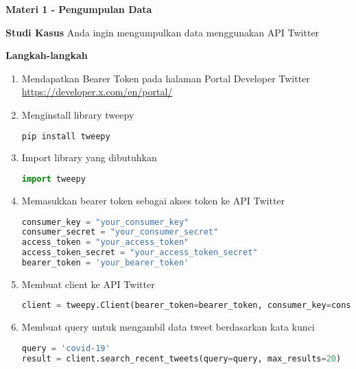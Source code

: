 \documentclass{article}
\begin{document}
    \begin{flushleft}
        \textbf{Materi 1 - Pengumpulan Data}
        \newline
        
        \textbf{Studi Kasus}
        \newline
        Anda ingin mengumpulkan data menggunakan API Twitter
        \newline

        \textbf{Langkah-langkah}

        \begin{enumerate}
            \item Mendapatkan Bearer Token pada halaman Portal Developer Twitter \href{https://developer.x.com/en/portal/}{https://developer.x.com/en/portal/}
            \item Menginstall library tweepy
            \lstset{style=bashstyle}
            \begin{lstlisting}[language=bash]
pip install tweepy
            \end{lstlisting}

            \item Import library yang dibutuhkan
            \lstset{style=pythonstyle}
            \begin{lstlisting}[language=python]
import tweepy
            \end{lstlisting}

            \item Memasukkan bearer token sebagai akses token ke API Twitter
            \lstset{style=pythonstyle}
            \begin{lstlisting}[language=python]
consumer_key = "your_consumer_key"
consumer_secret = "your_consumer_secret"
access_token = "your_access_token"
access_token_secret = "your_access_token_secret"
bearer_token = 'your_bearer_token'
            \end{lstlisting}

            \item Membuat client ke API Twitter
            \lstset{style=pythonstyle}
            \begin{lstlisting}[language=python]
client = tweepy.Client(bearer_token=bearer_token, consumer_key=consumer_key, consumer_secret=consumer_secret, access_token=access_token, access_token_secret=access_token_secret)            \end{lstlisting}

            \item Membuat query untuk mengambil data tweet berdasarkan kata kunci
            \lstset{style=pythonstyle}
            \begin{lstlisting}[language=python]
query = 'covid-19'
result = client.search_recent_tweets(query=query, max_results=20)
            \end{lstlisting}
        \end{enumerate}
    \end{flushleft}
\end{document}
